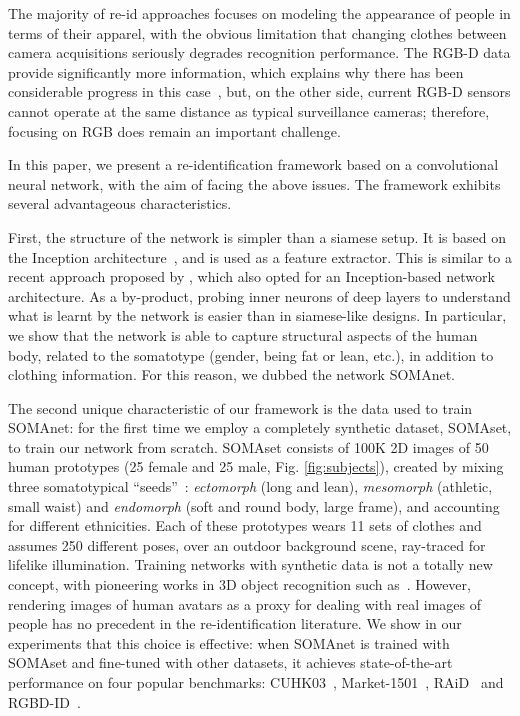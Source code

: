 \documentclass[10pt,journal,letterpaper,compsoc]{IEEEtran}
\begin{document}
The majority of re-id approaches focuses on modeling the appearance of people in terms of their apparel, with the obvious limitation that changing clothes between camera acquisitions seriously degrades recognition performance.
The RGB-D data provide significantly more information, which explains why there has been considerable progress in this case~\cite{munaro2014one,barbosa2012re}, but, on the other side,  current RGB-D sensors cannot operate at the same distance as typical surveillance cameras; therefore, focusing on RGB does remain an important challenge.

In this paper, we present a re-identification framework based on a convolutional neural network, with the aim of facing the above issues. The framework exhibits several advantageous characteristics.

First, the structure of the network is simpler than a siamese setup. It is based on the Inception architecture~\cite{googlenet}, and is used as a feature extractor. This is similar to a recent approach proposed by \cite{Xiao_2016_CVPR}, which also opted for an Inception-based network architecture. As a by-product, probing inner neurons of deep layers to understand what is learnt by the network is easier than in siamese-like designs. In particular, we show that the network is able to capture structural aspects of the human body, related to the somatotype (gender, being fat or lean, etc.), in addition to clothing information. For this reason, we dubbed the network SOMAnet.

The second unique characteristic of our framework is the data used to train SOMAnet: for the first time we employ a completely synthetic dataset, SOMAset, to train our network from scratch. SOMAset consists of 100K 2D images of 50 human prototypes (25 female and 25 male, Fig. \ref{fig:subjects}), created by mixing three somatotypical ``seeds''~\cite{sheldon1940varieties}:  \emph{ectomorph} (long and lean), \emph{mesomorph} (athletic, small waist) and \emph{endomorph} (soft and round body, large frame), and accounting for different ethnicities. Each of these prototypes wears 11 sets of clothes and assumes 250 different poses, over an outdoor background scene, ray-traced for lifelike illumination. Training networks with synthetic data is not a totally new concept, with pioneering works in 3D object recognition such as~\cite{peng2015learning,zhang2015learning,Borji_2016_CVPR}. However, rendering images of human avatars as a proxy for dealing with real images of people has no precedent in the re-identification literature. We show in our experiments that this choice is effective: when SOMAnet is trained with SOMAset and fine-tuned with other datasets, it achieves state-of-the-art performance on
 four popular benchmarks: CUHK03~\cite{li2014deepreid}, Market-1501~\cite{market}, RAiD~\cite{Das2014} and  RGBD-ID~\cite{barbosa2012re}.
\end{document}

